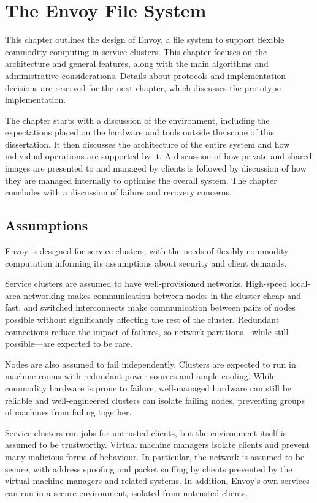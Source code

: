 \chapter{The Envoy File System}\label{cha:design}

This chapter outlines the design of Envoy, a file system to support flexible commodity computing in service clusters. This chapter focuses on the architecture and general features, along with the main algorithms and administrative considerations. Details about protocols and implementation decisions are reserved for the next chapter, which discusses the prototype implementation.

The chapter starts with a discussion of the environment, including the expectations placed on the hardware and tools outside the scope of this dissertation. It then discusses the architecture of the entire system and how individual operations are supported by it. A discussion of how private and shared images are presented to and managed by clients is followed by discussion of how they are managed internally to optimise the overall system. The chapter concludes with a discussion of failure and recovery concerns.

\section{Assumptions}

Envoy is designed for service clusters, with the needs of flexibly commodity computation informing its assumptions about security and client demands.

Service clusters are assumed to have well-provisioned networks. High-speed local-area networking makes communication between nodes in the cluster cheap and fast, and switched interconnects make communication between pairs of nodes possible without significantly affecting the rest of the cluster. Redundant connections reduce the impact of failures, so network partitions---while still possible---are expected to be rare.

Nodes are also assumed to fail independently. Clusters are expected to run in machine rooms with redundant power sources and ample cooling. While commodity hardware is prone to failure, well-managed hardware can still be reliable and well-engineered clusters can isolate failing nodes, preventing groups of machines from failing together.

Service clusters run jobs for untrusted clients, but the environment itself is assumed to be trustworthy. Virtual machine managers isolate clients and prevent many malicious forms of behaviour. In particular, the network is assumed to be secure, with address spoofing and packet sniffing by clients prevented by the virtual machine managers and related systems. In addition, Envoy's own services can run in a secure environment, isolated from untrusted clients.

